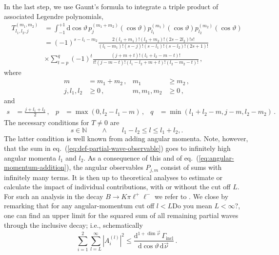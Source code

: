 \documentclass[aps,prd,reprint,nofootinbib,preprintnumbers]{revtex4}
\newcommand{\refeq}[1]{eq.~(\ref{eq:#1})}
\newcommand{\rmdx}[1]{\mbox{d} #1 \,} %
\renewcommand{\theta}{\vartheta}
\newcommand{\fred}[1]{{\color{brown!85!black}#1}}
\begin{document}
In the last step, we use Gaunt's formula \cite{Gaunt:1929} to integrate a triple product of associated Legendre polynomials,
\begin{equation}
\begin{aligned}
    T_{l_1,l_2,j}^{(m_1,m_2)}
        & = \int_{-1}^{+1} \rmdx{\cos\theta} p_{j}^{(m_1 + m_2)}(\cos\theta) p_{l_1}^{(m_1)}(\cos\theta) p_{l_2}^{(m_2)}(\cos\theta)\\
        & = (-1)^{s - l_1 - m_2} \frac{2 (l_1 + m_1)! (l_2 + m_2)! (2s - 2 l_2)! s!}{(l_1 - m_1)! (s - j)! (s - l_1)! (s - l_2)! (2s + 1)!}\\
        & \times \sum_{t=p}^q (-1)^t \frac{(j + m + t)!(l_1 + l_2 - m - t)!}{t! (j - m - t)! (l_1 - l_2 + m + t)! (l_2 - m_2 - t)!}\,,
\end{aligned}
\end{equation}
where
\begin{equation}
\begin{aligned}
    m & = m_1 + m_2\,, &
    m_1 & \geq m_2\,,  \\
    j, l_1, l_2 & \geq 0\,, &
    m, m_1, m_2 & \geq 0\,,
\end{aligned}
\end{equation}
and
\begin{equation}
\begin{aligned}
    s & = \frac{j + l_1 + l_2}{2}\,, &
    p & = \max(0, l_2 - l_1 - m)\,, &
    q & = \min(l_1 + l_2 - m, j - m, l_2 - m_2)\,.
\end{aligned}
\end{equation}
The necessary conditions for $T \neq 0$ are
\begin{equation}
    \label{eq:angular-momentum-addition}
    s \in \mathbb{N}\qquad \wedge \qquad l_1 - l_2 \leq l \leq l_1 + l_2,.
\end{equation}
The latter condition is well known from adding angular momenta. Note, however, that
the sum in \refeq{def-partial-wave-observable} goes to infinitely high angular momenta $l_1$ and $l_2$. As a consequence
of this and of \refeq{angular-momentum-addition}, the angular observables $P_{j,m}$
consist of sums with infinitely many terms. It is then up to theoretical analyses to
estimate or calculate the impact of individual contributions, with or without the cut off $L$.
For such an analysis in the decay $B\to K\pi\ell^+\ell^-$ we refer to \cite{Das:2014sra}.
We close by remarking that for any angular-momentum cut off $l < L$\fred{Do you mean $L < \infty$?}, one can find an upper limit for the squared sum
of all remaining partial waves through the inclusive decay; i.e., schematically
\begin{equation}
    \sum_{i=1}^2 \sum_{l=L}^\infty |A_i^{(l)}|^2 \leq \frac{\rmdx{^{1 + \dim\vec\nu}} \Gamma_\text{incl}}{\rmdx{\cos\theta} \rmdx{\vec\nu}}\,.
\end{equation}



\end{document}
